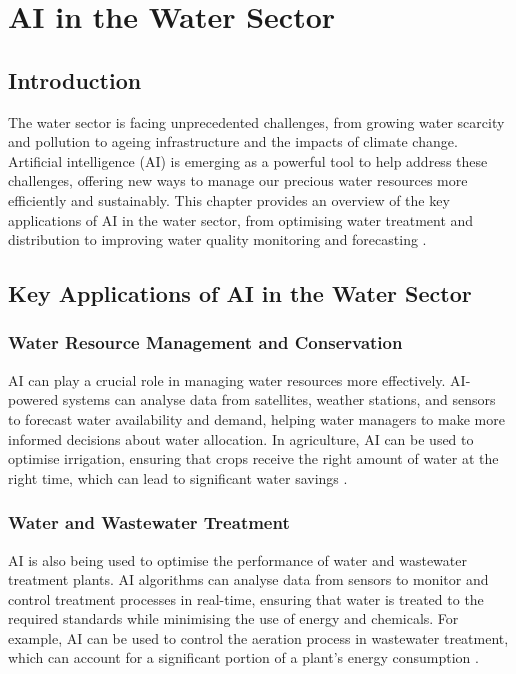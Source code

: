 \chapter{AI in the Water Sector}
\label{cha:ai_in_water}

\section{Introduction}

The water sector is facing unprecedented challenges, from growing water scarcity and pollution to ageing infrastructure and the impacts of climate change. Artificial intelligence (AI) is emerging as a powerful tool to help address these challenges, offering new ways to manage our precious water resources more efficiently and sustainably. This chapter provides an overview of the key applications of AI in the water sector, from optimising water treatment and distribution to improving water quality monitoring and forecasting \parencite{hussain2024artificial}.

\section{Key Applications of AI in the Water Sector}

\subsection{Water Resource Management and Conservation}

AI can play a crucial role in managing water resources more effectively. AI-powered systems can analyse data from satellites, weather stations, and sensors to forecast water availability and demand, helping water managers to make more informed decisions about water allocation. In agriculture, AI can be used to optimise irrigation, ensuring that crops receive the right amount of water at the right time, which can lead to significant water savings \parencite{goyal2020review}.

\subsection{Water and Wastewater Treatment}

AI is also being used to optimise the performance of water and wastewater treatment plants. AI algorithms can analyse data from sensors to monitor and control treatment processes in real-time, ensuring that water is treated to the required standards while minimising the use of energy and chemicals. For example, AI can be used to control the aeration process in wastewater treatment, which can account for a significant portion of a plant's energy consumption \parencite{satoh2023can}.

